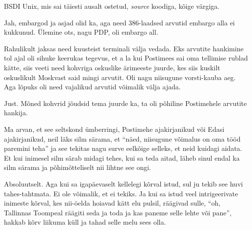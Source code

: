 
BSDI Unix, mis sai täiesti ausalt ostetud, \emph{source} koodiga,  kõige värgiga. 


Jah, embargod ja asjad olid ka, aga need 386-laadsed arvutid embargo alla ei kukkunud. Ülemine ots, nagu PDP, oli embargo all. 

Rahulikult jaksas need kuusteist terminali välja vedada. Eks arvutite hankimine tol ajal oli  sihuke keerukas tegevus, et a la kui  Postimees sai oma tellimise rublad kätte, siis veeti need kohvriga oskuslike ärimeeste juurde, kes siis kuskilt oskuslikult Moskvast said mingi arvutit. Oli nagu niisugune vorsti-kauba aeg. Aga lõpuks oli need vajalikud arvutid võimalik välja ajada.


Just. Mõned kohvrid jõudsid tema juurde ka, ta oli põhiline Postimehele arvutite hankija.


Ma arvan, et  see seltskond ümberringi, Postimehe ajakirjanikud või Edasi ajakirjanikud, neil läks silm särama, et \enquote{näed, niisugune võimalus on  oma tööd paremini teha} ja see tekitas nagu surve eelkõige selleks, et neid kuidagi aidata. Et kui inimesel silm särab midagi tehes, kui sa teda aitad, läheb sinul endal ka silm särama ja põhimõtteliselt nii lihtne see ongi.


Absoluutselt. Aga kui sa igapäevaselt kellelegi kõrval istud, sul ju tekib see huvi tahes-tahtmata. Ei ole võimalik, et ei tekiks. Ja kui sa istud veel intrigeerivate inimeste kõrval, kes nii-öelda hoiavad kätt elu pulsil, räägivad sulle, \enquote{oh,  Tallinnas Toompeal räägiti seda ja toda ja kas paneme selle lehte või pane}, hakkab kõrv liikuma küll ja tahad selle  melu sees olla.


